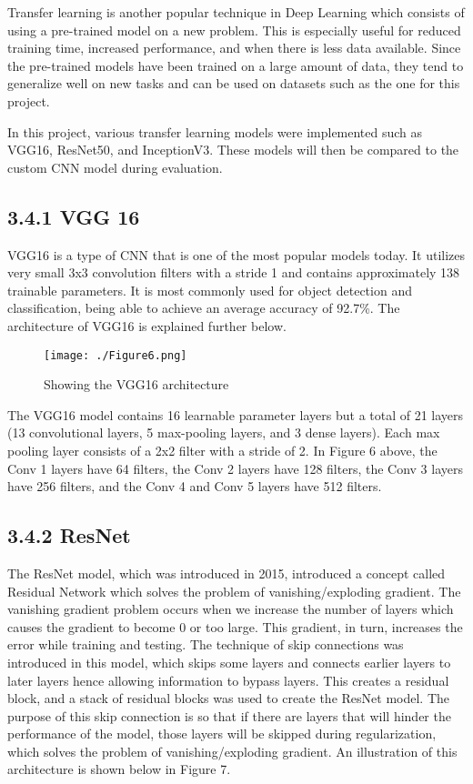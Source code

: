 \documentclass[
]{article}
\begin{document}
Transfer learning is another popular technique in Deep Learning which
consists of using a pre-trained model on a new problem. This is
especially useful for reduced training time, increased performance, and
when there is less data available. Since the pre-trained models have
been trained on a large amount of data, they tend to generalize well on
new tasks and can be used on datasets such as the one for this project.

In this project, various transfer learning models were implemented such
as VGG16, ResNet50, and InceptionV3. These models will then be compared
to the custom CNN model during evaluation.

\hypertarget{vgg-16}{%
\subsection{\texorpdfstring{\textbf{3.4.1 VGG
16}}{3.4.1 VGG 16}}\label{vgg-16}}

VGG16 is a type of CNN that is one of the most popular models today. It
utilizes very small 3x3 convolution filters with a stride 1 and contains
approximately 138 trainable parameters. It is most commonly used for
object detection and classification, being able to achieve an average
accuracy of 92.7\%. The architecture of VGG16 is explained further
below.

\begin{figure}[hbt!]
  \centering
  \texttt{[image: ./Figure6.png]}
  \caption{Showing the VGG16 architecture}
  \label{fig:figure5}
\end{figure}

The VGG16 model contains 16 learnable parameter layers but a total of 21
layers (13 convolutional layers, 5 max-pooling layers, and 3 dense
layers). Each max pooling layer consists of a 2x2 filter with a stride
of 2. In Figure 6 above, the Conv 1 layers have 64 filters, the Conv 2
layers have 128 filters, the Conv 3 layers have 256 filters, and the
Conv 4 and Conv 5 layers have 512 filters.

\hypertarget{resnet}{%
\subsection{\texorpdfstring{\textbf{3.4.2
ResNet}}{3.4.2 ResNet}}\label{resnet}}

The ResNet model, which was introduced in 2015, introduced a concept
called Residual Network which solves the problem of vanishing/exploding
gradient. The vanishing gradient problem occurs when we increase the
number of layers which causes the gradient to become 0 or too large.
This gradient, in turn, increases the error while training and testing.
The technique of skip connections was introduced in this model, which
skips some layers and connects earlier layers to later layers hence
allowing information to bypass layers. This creates a residual block,
and a stack of residual blocks was used to create the ResNet model. The
purpose of this skip connection is so that if there are layers that will
hinder the performance of the model, those layers will be skipped during
regularization, which solves the problem of vanishing/exploding
gradient. An illustration of this architecture is shown below in Figure
7.
\end{document}
